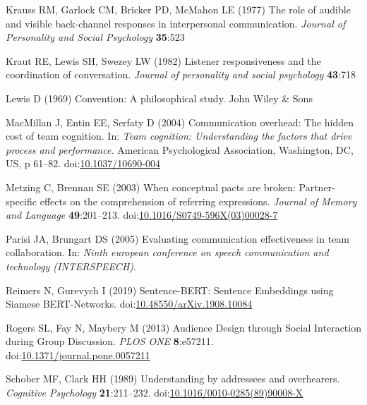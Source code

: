 \documentclass[
  english,
]{article}
\newlength{\cslhangindent}
\newlength{\cslentryspacingunit} %
\newenvironment{CSLReferences}[2] %
 {%
  \setlength{\parindent}{0pt}
  \ifodd #1
  \let\oldpar\par
  \def\par{\hangindent=\cslhangindent\oldpar}
  \fi
  \setlength{\parskip}{#2\cslentryspacingunit}
 }%
 {}
\begin{document}
\begin{CSLReferences}{1}{0}
\leavevmode{}%
Krauss RM, Garlock CM, Bricker PD, McMahon LE (1977) The role of audible and visible back-channel responses in interpersonal communication. \emph{Journal of Personality and Social Psychology} \textbf{35}:523

\leavevmode{}%
Kraut RE, Lewis SH, Swezey LW (1982) Listener responsiveness and the coordination of conversation. \emph{Journal of personality and social psychology} \textbf{43}:718

\leavevmode{}%
Lewis D (1969) Convention: A philosophical study. John Wiley \& Sons

\leavevmode{}%
MacMillan J, Entin EE, Serfaty D (2004) Communication overhead: {The} hidden cost of team cognition. In: \emph{Team cognition: {Understanding} the factors that drive process and performance.} American Psychological Association, Washington, DC, US, p 61--82. doi:\href{https://doi.org/10.1037/10690-004}{10.1037/10690-004}

\leavevmode{}%
Metzing C, Brennan SE (2003) When conceptual pacts are broken: {Partner-specific} effects on the comprehension of referring expressions. \emph{Journal of Memory and Language} \textbf{49}:201--213. doi:\href{https://doi.org/10.1016/S0749-596X(03)00028-7}{10.1016/S0749-596X(03)00028-7}

\leavevmode{}%
Parisi JA, Brungart DS (2005) Evaluating communication effectiveness in team collaboration. In: \emph{Ninth european conference on speech communication and technology (INTERSPEECH)}.

\leavevmode{}%
Reimers N, Gurevych I (2019) Sentence-{BERT}: {Sentence Embeddings} using {Siamese BERT-Networks}. doi:\href{https://doi.org/10.48550/arXiv.1908.10084}{10.48550/arXiv.1908.10084}

\leavevmode{}%
Rogers SL, Fay N, Maybery M (2013) Audience {Design} through {Social Interaction} during {Group Discussion}. \emph{PLOS ONE} \textbf{8}:e57211. doi:\href{https://doi.org/10.1371/journal.pone.0057211}{10.1371/journal.pone.0057211}

\leavevmode{}%
Schober MF, Clark HH (1989) Understanding by addressees and overhearers. \emph{Cognitive Psychology} \textbf{21}:211--232. doi:\href{https://doi.org/10.1016/0010-0285(89)90008-X}{10.1016/0010-0285(89)90008-X}


\end{CSLReferences}
\end{document}
